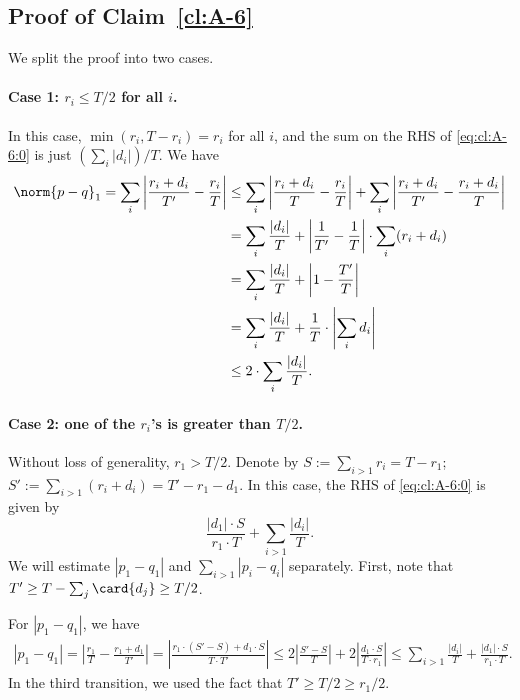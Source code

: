 \subsection{Proof of Claim~\ref{cl:A-6}}
We split the proof into two cases.
	\paragraph{Case 1: $r_i \le T/2$ for all $i$.} In this case,
	$\min(r_i, T-r_i)=r_i$ for all $i$, and the sum on the RHS of \eqref{eq:cl:A-6:0} is just $(\sum_i |d_i|)/T$. We have
	\begin{align*}
	\norm{p-q}_1 = \sum_i \left| \frac{r_i+d_i}{T'} - \frac{r_i}{T} \right|
    &\le
	\sum_i \left| \frac{r_i+d_i}{T} - \frac{r_i}{T} \right| +
	\sum_i \left| \frac{r_i+d_i}{T'} - \frac{r_i+d_i}{T} \right| \\
	&=\sum_i \frac{|d_i|}{T} + \left|\frac{1}{T'}-\frac{1}{T}\right|\cdot
	\sum_i (r_i+d_i)\\
    &= \sum_i \frac{|d_i|}{T}  + \left|1-\frac{T'}{T}\right|\\
    &=\sum_i \frac{|d_i|}{T} +\frac{1}{T} \cdot \left| \sum_i d_i \right| \\
	&\leq 2\cdot \sum_i \frac{|d_i|}{T}.
	\end{align*}
	
	\paragraph{Case 2: one of the $r_i$'s is greater than $T/2$.}
	Without loss of generality, $r_1>T/2$. Denote by $S:=\sum_{i>1} r_i = T-r_1$; $S':=\sum_{i>1} (r_i+d_i) = T'-r_1-d_1$.
	 In this case, the RHS of \eqref{eq:cl:A-6:0} is given by
	 \begin{equation}
	 \label{eq:cl:A-6:1}
	 \frac{|d_1| \cdot S}{r_1\cdot T} + \sum_{i>1} \frac{|d_i|}{T}.
	 \end{equation}
	 We will estimate $|p_1-q_1|$ and $\sum_{i>1} |p_i-q_i|$ separately. First,
     note that $T'\geq T - \sum_{j}\card{d_j}\geq T/2$.

For $|p_1-q_1|$, we have	
	 \begin{align*}
	 |p_1-q_1|= \left| \frac{r_1}{T} - \frac{r_1+d_1}{T'} \right| =
	  \left| \frac{r_1\cdot(S'-S)+ d_1\cdot S}{T\cdot T' } \right|
\le
	   2\left| \frac{S'-S}{T} \right|+
	   2\left| \frac{ d_1\cdot S}{T\cdot r_1 } \right|
\le \sum_{i>1} \frac{|d_i|}{T} +
	    \frac{|d_1| \cdot S}{r_1\cdot T}.
	 \end{align*}
In the third transition, we used the fact that $T' \geq T/2\geq r_1/2$.
	
